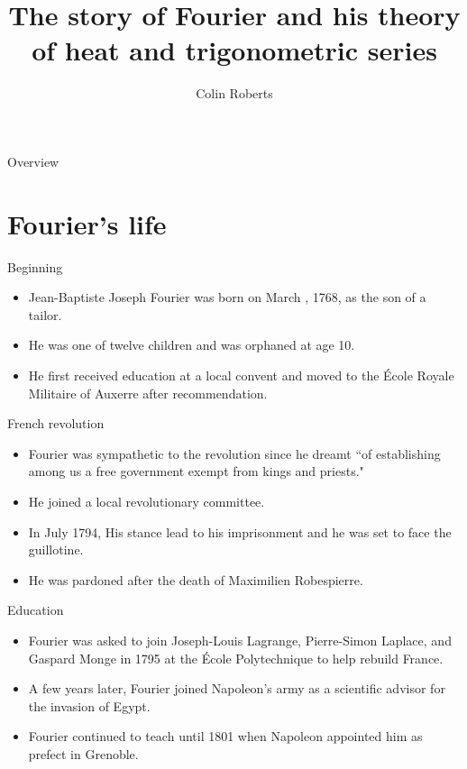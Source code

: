 \documentclass[aspectratio=169]{beamer}
\author{Colin Roberts}
\title{The story of Fourier and his theory of heat and trigonometric series}
\subtitle{}
\begin{document}
\begin{frame}{Overview}
\tableofcontents
\end{frame}

\section{Fourier's life}

\begin{frame}{Beginning}
\vfill
\begin{itemize}
    \pause
    \item Jean-Baptiste Joseph Fourier was born on March , 1768, as the son of a tailor.
    \pause
    \item He was one of twelve children and was orphaned at age 10.
    \pause
    \item He first received education at a local convent and moved to the \'{E}cole Royale Militaire of Auxerre after recommendation.
\end{itemize}
\vfill
\end{frame}

\begin{frame}{French revolution}
\vfill
\begin{itemize}
    \pause
    \item Fourier was sympathetic to the revolution since he dreamt ``of establishing among us a free government exempt from kings and priests."
    \pause
    \item He joined a local revolutionary committee.
    \pause
    \item In July 1794, His stance lead to his imprisonment and he was set to face the guillotine.
    \pause
    \item He was pardoned after the death of Maximilien Robespierre.
\end{itemize}
\vfill
\end{frame}

\begin{frame}{Education}
\vfill
\begin{itemize}
    \pause
    \item Fourier was asked to join Joseph-Louis Lagrange, Pierre-Simon Laplace, and Gaspard Monge in 1795 at the \'Ecole Polytechnique to help rebuild France.
    \pause
    \item A few years later, Fourier joined Napoleon's army as a scientific advisor for the invasion of Egypt. 
    \pause
    \item Fourier continued to teach until 1801 when Napoleon appointed him as prefect in Grenoble.
\end{itemize}
\vfill
\end{frame}
\end{document}
